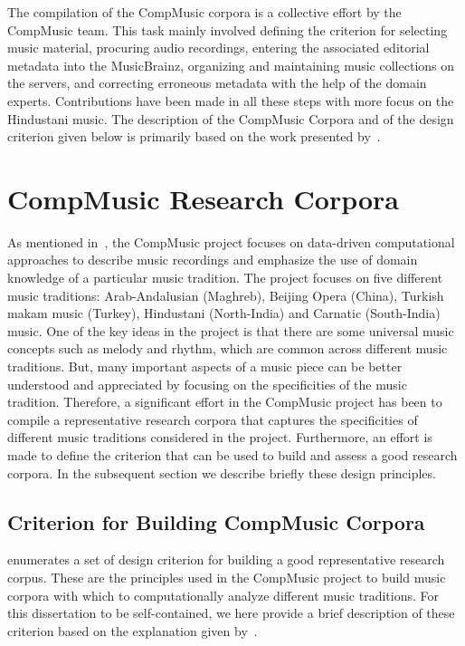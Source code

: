 The compilation of the CompMusic corpora is a collective effort by the CompMusic team. This task mainly involved defining the criterion for selecting music material, procuring audio recordings, entering the associated editorial metadata into the MusicBrainz, organizing and maintaining music collections on the servers, and correcting erroneous metadata with the help of the domain experts. Contributions have been made in all these steps with more focus on the Hindustani music. The description of the CompMusic Corpora and of the design criterion given below is primarily based on the work presented by~\cite{CM_Corpora_Ajay14,serra:14:corpus}.


\section{CompMusic Research Corpora}
\label{sec:corpus_compmusic_research_corpora}

As mentioned in~, the CompMusic project focuses on data-driven computational approaches to describe music recordings and emphasize the use of domain knowledge of a particular music tradition. The project focuses on five different music traditions: Arab-Andalusian (Maghreb), Beijing Opera (China), Turkish makam music (Turkey), Hindustani (North-India) and Carnatic (South-India) music. One of the key ideas in the project is that there are some universal music concepts such as melody and rhythm, which are common across different music traditions. But, many important aspects of a music piece can be better understood and appreciated by focusing on the specificities of the music tradition. Therefore, a significant effort in the CompMusic project has been to compile a representative research corpora that captures the specificities of different music traditions considered in the project. Furthermore, an effort is made to define the criterion that can be used to build and assess a good research corpora. In the subsequent section we describe briefly these design principles.

\subsection{Criterion for Building CompMusic Corpora}
\label{sec:corpus_criterion_for_corpora}

\cite{serra:14:corpus} enumerates a set of design criterion for building a good representative research corpus. These are the principles used in the CompMusic project to build music corpora with which to computationally analyze different music traditions. For this dissertation to be self-contained, we here provide a brief description of these criterion based on the explanation given by~\cite{serra:14:corpus}.

